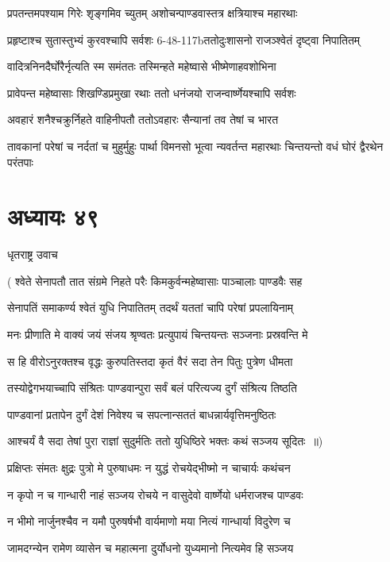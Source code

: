 \twolineshloka
{प्रपतन्तमपश्याम गिरेः शृङ्गमिव च्युतम्}
{अशोचन्पाण्डवास्तत्र क्षत्रियाश्च महारथाः}


\twolineshloka
{प्रहृष्टाश्च सुतास्तुभ्यं कुरवश्चापि सर्वशः}
{6-48-117bततोदुःशासनो राजञ्श्वेतं दृष्ट्वा निपातितम्}


\twolineshloka
{वादित्रनिनदैर्घोरैर्नृत्यति स्म समंततः}
{तस्मिन्हते महेष्वासे भीष्मेणाहवशोभिना}


\twolineshloka
{प्रावेपन्त महेष्वासाः शिखण्डिप्रमुखा रथाः}
{ततो धनंजयो राजन्वार्ष्णेयश्चापि सर्वशः}


\twolineshloka
{अवहारं शनैश्चक्रुर्निहते वाहिनीपतौ}
{ततोऽवहारः सैन्यानां तव तेषां च भारत}


\threelineshloka
{तावकानां परेषां च नर्दतां च मुहुर्मुहुः}
{पार्था विमनसो भूत्वा न्यवर्तन्त महारथाः}
{चिन्तयन्तो वधं घोरं द्वैरथेन परंतपाः}


\chapter{अध्यायः ४९}
\twolineshloka
{धृतराष्ट्र उवाच}
{}


\twolineshloka
{( श्वेते सेनापतौ तात संग्रमे निहते परैः}
{किमकुर्वन्महेष्वासाः पाञ्चालाः पाण्डवैः सह}


\twolineshloka
{सेनापतिं समाकर्ण्य श्वेतं युधि निपातितम्}
{तदर्थं यततां चापि परेषां प्रपलायिनाम्}


\twolineshloka
{मनः प्रीणाति मे वाक्यं जयं संजय श्रृण्वतः}
{प्रत्युपायं चिन्तयन्तः सञ्जनाः प्रस्रवन्ति मे}


\twolineshloka
{स हि वीरोऽनुरक्तश्च वृद्धः कुरुपतिस्तदा}
{कृतं वैरं सदा तेन पितुः पुत्रेण धीमता}


\twolineshloka
{तस्योद्वेगभयाच्चापि संश्रितः पाण्डवान्पुरा}
{सर्वं बलं परित्यज्य दुर्गं संश्रित्य तिष्ठति}


\twolineshloka
{पाण्डवानां प्रतापेन दुर्गं देशं निवेश्य च}
{सपत्नान्सततं बाधन्नार्यवृत्तिमनुष्ठितः}


\twolineshloka
{आश्चर्यं वै सदा तेषां पुरा राज्ञां सुदुर्मतिः}
{ततो युधिष्ठिरे भक्तः कथं सञ्जय सूदितः ॥)}


\twolineshloka
{प्रक्षिप्तः संमतः क्षुद्रः पुत्रो मे पुरुषाधमः}
{न युद्धं रोचयेद्भीष्मो न चाचार्यः कथंचन}


\twolineshloka
{न कृपो न च गान्धारी नाहं सञ्जय रोचये}
{न वासुदेवो वार्ष्णेयो धर्मराजश्च पाण्डवः}


\twolineshloka
{न भीमो नार्जुनश्चैव न यमौ पुरुषर्षभौ}
{वार्यमाणो मया नित्यं गान्धार्या विदुरेण च}


\twolineshloka
{जामदग्न्येन रामेण व्यासेन च महात्मना}
{दुर्योधनो युध्यमानो नित्यमेव हि सञ्जय}


